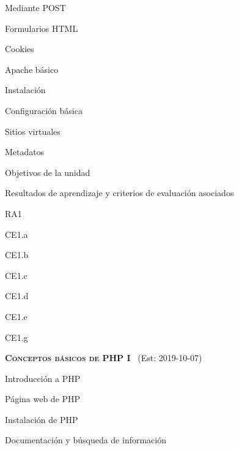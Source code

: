 \begin{longenum}
\begin{longenum}
\begin{longenum}
\begin{longenum}
                \item Mediante POST
                \item Formularios HTML
            \end{longenum}
            \item Cookies
        \end{longenum}
        \item Apache básico \opcional\
        \begin{longenum}
            \item Instalación
            \item Configuración básica
            \item Sitios virtuales
        \end{longenum}
        \item Metadatos
        \begin{longenum}
            \item Objetivos de la unidad
            \item Resultados de aprendizaje y criterios de evaluación asociados
            \begin{longenum}
                \item RA1
                \begin{longenum}
                    \item CE1.a
                    \item CE1.b
                    \item CE1.c
                    \item CE1.d
                    \item CE1.e
                    \item CE1.g
                \end{longenum}
            \end{longenum}
        \end{longenum}
    \end{longenum}
    \item \textbf{\textsc{Conceptos básicos de PHP I}} \ (Est: 2019-10-07)
    \begin{longenum}
        \item Introducción a PHP
        \begin{longenum}
            \item Página web de PHP
            \item Instalación de PHP
            \item Documentación y búsqueda de información
        \end{longenum}

\end{longenum}
\end{longenum}

